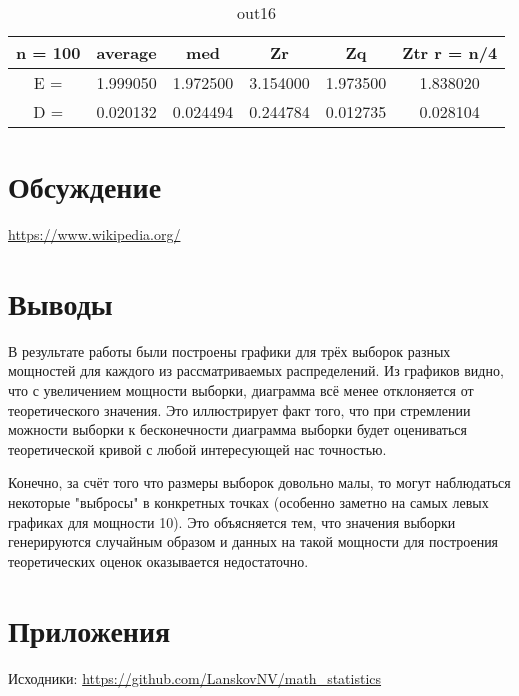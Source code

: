 \documentclass[12pt]{article}
\begin{document}
\begin{table}[H]
\caption{out16}
\label{tab:my_label16}
\begin{center}
\vspace{5mm}
\begin{tabular}{|c|c|c|c|c|c|}
\hline
n = 100   &average     &med         &Zr          &Zq          &Ztr r = n/4 \\
\hline
E =       &1.999050    &1.972500    &3.154000    &1.973500    &1.838020    \\
\hline
D =       &0.020132    &0.024494    &0.244784    &0.012735    &0.028104    \\
\hline
\end{tabular}
\end{center}
\end{table}

\section{Обсуждение}

\begin{thebibliography}{}
     \url{https://www.wikipedia.org/}
\end{thebibliography}

\section{Выводы}
В результате работы были построены графики для трёх выборок разных мощностей для каждого из рассматриваемых распределений. Из графиков видно, что с увеличением мощности выборки, диаграмма всё менее отклоняется от теоретического значения. Это иллюстрирует факт того, что при стремлении можности выборки к бесконечности диаграмма выборки будет оцениваться теоретической кривой с любой интересующей нас точностью.
\par
Конечно, за счёт того что размеры выборок довольно малы, то могут наблюдаться некоторые "выбросы" в конкретных точках (особенно заметно на самых левых графиках для мощности 10). Это объясняется тем, что значения выборки генерируются случайным образом и данных на такой мощности для построения теоретических оценок оказывается недостаточно.

\section{Приложения}

Исходники: \url{https://github.com/LanskovNV/math_statistics}
\end{document}
